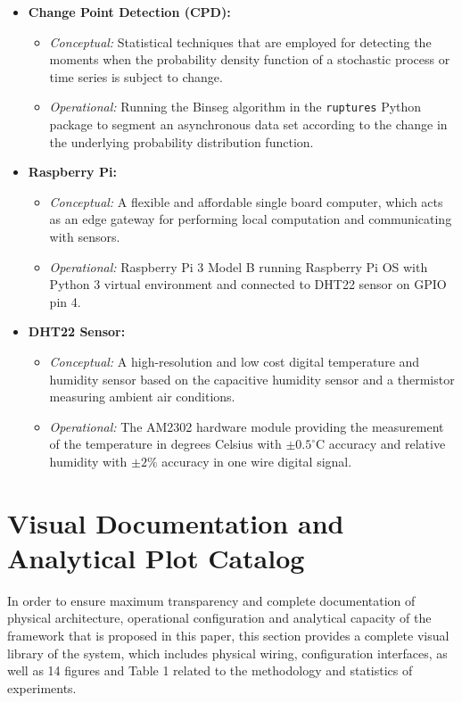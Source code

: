 \begin{itemize}
\begin{itemize}
        \item \textit{Operational:} Instances within the time series of temperatures where the computed Z-score value is above the cut-off of $|Z| \geq 2.0$ (moderate) or $|Z| \geq 3.0$ (extreme).
    \end{itemize}
    \item \textbf{Change Point Detection (CPD):}
    \begin{itemize}
      \item \textit{Conceptual:} Statistical techniques that are employed for detecting the moments when the probability density function of a stochastic process or time series is subject to change.
        \item \textit{Operational:} Running the Binseg algorithm in the \texttt{ruptures} Python package to segment an asynchronous data set according to the change in the underlying probability distribution function.
    \end{itemize}
    \item \textbf{Raspberry Pi:}
    \begin{itemize}
        \item \textit{Conceptual:} A flexible and affordable single board computer, which acts as an edge gateway for performing local computation and communicating with sensors.
        \item \textit{Operational:} Raspberry Pi 3 Model B running Raspberry Pi OS with Python 3 virtual environment and connected to DHT22 sensor on GPIO pin 4.
    \end{itemize}
    \item \textbf{DHT22 Sensor:}
    \begin{itemize}
        \item \textit{Conceptual:} A high-resolution and low cost digital temperature and humidity sensor based on the capacitive humidity sensor and a thermistor measuring ambient air conditions.
        \item \textit{Operational:} The AM2302 hardware module providing the measurement of the temperature in degrees Celsius with $\pm0.5^{\circ}$C accuracy and relative humidity with $\pm2\%$ accuracy in one wire digital signal.
    \end{itemize}
\end{itemize}

\section{Visual Documentation and Analytical Plot Catalog}
In order to ensure maximum transparency and complete documentation of physical architecture, operational configuration and analytical capacity of the framework that is proposed in this paper, this section provides a complete visual library of the system, which includes physical wiring, configuration interfaces, as well as 14 figures and Table 1 related to the methodology and statistics of experiments.

